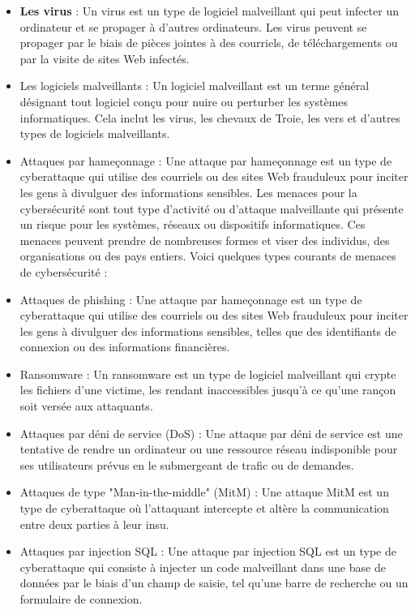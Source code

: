 \begin{itemize}
\item \textbf{Les virus} : Un virus est un type de logiciel malveillant qui peut infecter un ordinateur et se propager à d'autres ordinateurs. Les virus peuvent se propager par le biais de pièces jointes à des courriels, de téléchargements ou par la visite de sites Web infectés.
\item Les logiciels malveillants : Un logiciel malveillant est un terme général désignant tout logiciel conçu pour nuire ou perturber les systèmes informatiques. Cela inclut les virus, les chevaux de Troie, les vers et d'autres types de logiciels malveillants.
\item Attaques par hameçonnage : Une attaque par hameçonnage est un type de cyberattaque qui utilise des courriels ou des sites Web frauduleux pour inciter les gens à divulguer des informations sensibles. Les menaces pour la cybersécurité sont tout type d'activité ou d'attaque malveillante qui présente un risque pour les systèmes, réseaux ou dispositifs informatiques. Ces menaces peuvent prendre de nombreuses formes et viser des individus, des organisations ou des pays entiers. Voici quelques types courants de menaces de cybersécurité :
\item Attaques de phishing : Une attaque par hameçonnage est un type de cyberattaque qui utilise des courriels ou des sites Web frauduleux pour inciter les gens à divulguer des informations sensibles, telles que des identifiants de connexion ou des informations financières.
\item Ransomware : Un ransomware est un type de logiciel malveillant qui crypte les fichiers d'une victime, les rendant inaccessibles jusqu'à ce qu'une rançon soit versée aux attaquants.
\item Attaques par déni de service (DoS) : Une attaque par déni de service est une tentative de rendre un ordinateur ou une ressource réseau indisponible pour ses utilisateurs prévus en le submergeant de trafic ou de demandes.
\item Attaques de type "Man-in-the-middle" (MitM) : Une attaque MitM est un type de cyberattaque où l'attaquant intercepte et altère la communication entre deux parties à leur insu.
\item Attaques par injection SQL : Une attaque par injection SQL est un type de cyberattaque qui consiste à injecter un code malveillant dans une base de données par le biais d'un champ de saisie, tel qu'une barre de recherche ou un formulaire de connexion.
\end{itemize}

